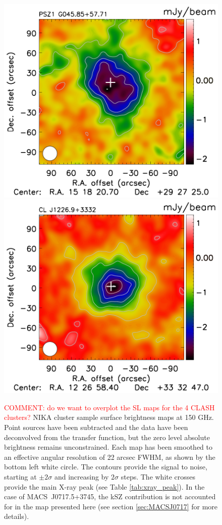 \documentclass[twocolumn,traditabstract]{aa}
\begin{document}
\begin{figure}[h]
\includegraphics[trim=0cm 0cm 0cm 0cm, clip=true, totalheight=5.4cm]{Figure/Map_PSZ1G045.pdf}
\includegraphics[trim=0cm 0cm 0cm 0cm, clip=true, totalheight=5.4cm]{Figure/Map_CLJ1227.pdf}
\caption{\footnotesize{\textcolor{red}{COMMENT: do we want to overplot the SL maps for the 4 CLASH clusters?} NIKA cluster sample surface brightness maps at 150 GHz. Point sources have been subtracted and the data have been deconvolved from the transfer function, but the zero level absolute brightness remains unconstrained. Each map has been smoothed to an effective angular resolution of 22 arcsec FWHM, as shown by the bottom left white circle. The contours provide the signal to noise, starting at $\pm 2 \sigma$ and increasing by $2 \sigma$ steps. The white crosses provide the main X-ray peak (see Table \ref{tab:xray_peak}). In the case of \mbox{MACS~J0717.5+3745}, the kSZ contribution is not accounted for in the map presented here (see section \ref{sec:MACSJ0717} for more details).}}
\label{fig:NIKA_cluster_sample}
\end{figure}
\end{document}
